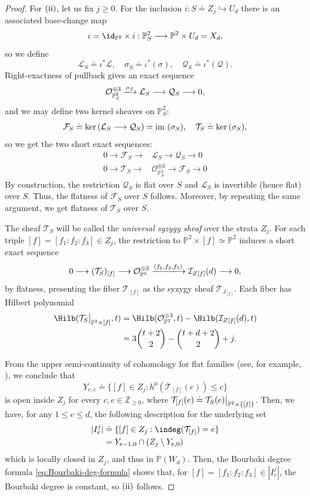 \documentclass[11pt]{amsart} %
\newcommand\restr[2]{{%
  \left.\kern-\nulldelimiterspace %
  #1 %
  \vphantom{\big|} %
  \right|_{#2} %
}}
\newcommand{\lar}{\longrightarrow}
\theoremstyle{definition}
\def\ker{{\rm ker}\,}
\def\NZQ{\mathbb}               %
\def\PP{{\NZQ P}}
\def\T{{\mathcal T}}
\begin{document}
\begin{proof}
For ${\rm (ii)}$, let us fix $j \geq 0$. For the inclusion $i : S \doteq Z_j \hookrightarrow U_d$ there is an associated base-change map
$$
\iota = \id_{\mathbb{P}^2} \times i : \mathbb{P}^2_S \lar \mathbb{P}^2 \times U_d = X_d,
$$
so we define
$$
\mathcal{L}_S \doteq \iota^* \mathcal{L}, \quad \sigma_S \doteq \iota^*(\sigma), \quad \mathcal{Q}_S \doteq \iota^*(\mathcal{Q}).
$$
Right-exactness of pullback gives an exact sequence
$$
\mathcal{O}_{\mathbb{P}^2_S}^{\oplus 3} \xlongrightarrow{\sigma_S} \mathcal{L}_S \lar \mathcal{Q}_S \lar 0,
$$
and we may define two kernel sheaves on $\mathbb{P}^2_S$: 
$$
\mathcal{F}_S \doteq \ker( \mathcal{L}_S \lar \mathcal{Q}_S ) = \text{im }(\sigma_S), \quad \T_S \doteq \ker(\sigma_S),
$$
so we get the two short exact sequences:
\begin{align*}
0 \lar \mathcal{F}_S \lar &\mathcal{L}_S \lar \mathcal{Q}_S \lar 0\\
0 \lar \mathcal{T}_S \lar &\mathcal{O}_{\mathbb{P}^2_S}^{\oplus 3} \lar \mathcal{F}_S \lar 0
\end{align*}
By construction, the restriction $\mathcal{Q}_S$ is flat over $S$ and $\mathcal{L}_S$ is invertible (hence flat) over $S$. Thus, the flatness of $\mathcal{F}_S$ over $S$ follows. Moreover, by repeating the same argument, we get flatness of $\mathcal{T}_S$ over $S$. 

The sheaf $\mathcal{T}_S$ will be called the \emph{universal syzygy sheaf} over the strata $Z_j$. For each triple $[f] = [f_1:f_2:f_3] \in Z_j$, the restriction to $\PP^2 \times [f] \simeq \PP^2$ induces a short exact sequence
$$
0 \lar (\mathcal{T}_S)_{[f]} \lar \mathcal{O}_{\mathbb{P}^2}^{\oplus 3} \xlongrightarrow{(f_1, f_2, f_3)} \mathcal{I}_{Z[f]}(d) \lar 0,
$$
by flatness, presenting the fiber $\mathcal{T}_{[f]}$ as the syzygy sheaf $\T_{J_{[f]}}$. Each fiber has Hilbert polynomial
\begin{align*}
\Hilb(\restr {\T_S} {\mathbb{P}^2 \times [f]}, t) &= \Hilb(\mathcal{O}_{\mathbb{P}^2}^{\oplus 3}, t) - \Hilb(\mathcal{I}_{Z[f]}(d), t) \\
&= 3\binom{t+2}{2}-\binom{t+d+2}{2}+j.  
\end{align*}

From the upper semi-continuity of cohomology for flat families (see, for example, \cite[Chapter III, Theorem 12.8]{hartshorne2013algebraic}), we conclude that
$$
Y_{e, c} \doteq \{[f] \in Z_j : h^0(\mathcal{T}_{[f]}(e)) \leq c\}
$$
is open inside $Z_j$ for every $c, e \in \mathbb{Z}_{\geq 0}$, where $\T_{[f]}(e) \doteq \restr {\T_S(e)} {\mathbb{P}^2 \times \{[f]\}}$. Then, we have, for any $1 \leq e \leq d$, the following description for the underlying set 
\begin{align*}
|I_{e}^j| &\doteq \{[f] \in Z_j : \indeg(\mathcal{T}_{[f]}) = e\}\\
&= Y_{e-1, 0} \cap (Z_j \setminus Y_{e,0})
\end{align*}
which is locally closed in $Z_j$, and thus in $\mathbb{P}(W_d)$. Then, the Bourbaki degree formula \eqref{eq:Bourbaki-deg-formula} shows that, for $[f] = [f_1:f_2:f_3] \in |I_e^j|$, the Bourbaki degree is constant, so ${\rm (ii)}$ follows. 


\end{proof}
\end{document}
